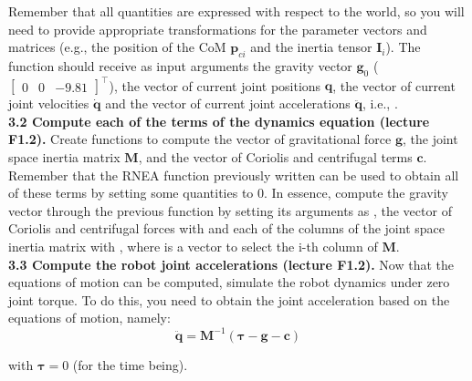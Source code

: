 \documentclass[11pt]{article}
\begin{document}
Remember that all quantities are expressed with respect to the world, so you will need to provide appropriate transformations for the parameter vectors and matrices (e.g., the position of the CoM $\mathbf{p}_{ci}$ and the inertia tensor $\mathbf{I}_i$). The function  should receive as input arguments the gravity vector $\mathbf{g}_0$ ($\begin{bmatrix}
	0 & 0 & -9.81
\end{bmatrix}^{\top}$), the vector of current joint positions $\mathbf{q}$, the vector of current joint velocities $\dot{\mathbf{q}}$ and the vector of current joint accelerations $\ddot{\mathbf{q}}$, i.e.,
. \\

\textbf{3.2 Compute each of the terms of the dynamics equation (lecture F1.2). } Create functions to compute the vector of gravitational force $\mathbf{g}$, the joint space inertia matrix $\mathbf{M}$, and the vector of Coriolis and centrifugal terms $\mathbf{c}$. Remember that the RNEA function previously written can be used to obtain all of these terms by setting some quantities to 0. In essence, compute the gravity vector through the previous function by setting its arguments as , the vector of Coriolis and centrifugal forces with  and each of the columns of the joint space inertia matrix with , where  is a vector to select the i-th column of $\mathbf{M}$.\\


\textbf{3.3 Compute the robot joint accelerations (lecture F1.2).} Now that the equations of motion can be computed, simulate the robot dynamics under zero joint torque. To do this, you need to obtain the joint acceleration based on the equations of motion, namely:
%
\begin{equation*}
	\ddot{\mathbf{q}} = \mathbf{M}^{-1} (\boldsymbol{\tau} - \mathbf{g} - \mathbf{c})
\end{equation*}

with $\boldsymbol{\tau} = 0$ (for the time being). \\
\end{document}
